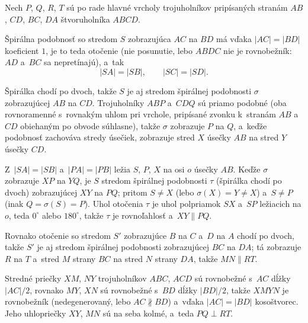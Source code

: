 {
    Nech $P$, $Q$, $R$, $T$ sú po rade hlavné vrcholy trojuholníkov pripísaných stranám $AB$, $CD$, $BC$, $DA$ štvoruholníka $ABCD$.

    Špirálna podobnosť so stredom $S$ zobrazujúca $AC$ na $BD$ má vďaka $|AC| = |BD|$ koeficient $1$, je to teda otočenie (nie posunutie, lebo $ABDC$ nie je rovnobežník: $AD$ a~$BC$ sa nepretínajú), a~tak
    $$
    |SA| = |SB|, \qquad |SC| = |SD|.
    $$

    Špirálka chodí po dvoch, takže $S$ je aj stredom špirálnej podobnosti $\sigma$ zobrazujúcej $AB$ na $CD$. Trojuholníky $ABP$ a~$CDQ$ sú priamo podobné (oba rovnoramenné s~rovnakým uhlom pri vrchole, pripísané zvonku k~stranám $AB$ a~$CD$ obiehaným po obvode súhlasne), takže $\sigma$ zobrazuje $P$ na $Q$, a~keďže podobnosť zachováva stredy úsečiek, zobrazuje stred $X$ úsečky $AB$ na stred $Y$ úsečky $CD$.


    Z~$|SA| = |SB|$ a~$|PA| = |PB|$ ležia $S$, $P$, $X$ na osi $o$ úsečky $AB$. Keďže $\sigma$ zobrazuje $XP$ na $YQ$, je $S$ stredom špirálnej podobnosti $\tau$ (špirálka chodí po dvoch) zobrazujúcej $XY$ na $PQ$; pritom $S \neq X$ (lebo $\sigma(X) = Y \neq X$) a~$S \neq P$ (inak $Q = \sigma(S) = P$). Uhol otočenia $\tau$ je uhol polpriamok $SX$ a~$SP$ ležiacich na $o$, teda $0^\circ$ alebo $180^\circ$, takže $\tau$ je rovnoľahlosť a~$XY \parallel PQ$.

    Rovnako otočenie so stredom $S'$ zobrazujúce $B$ na $C$ a~$D$ na $A$ chodí po dvoch, takže $S'$ je aj stredom špirálnej podobnosti zobrazujúcej $BC$ na $DA$; tá zobrazuje $R$ na $T$ a~stred $M$ strany $BC$ na stred $N$ strany $DA$, takže $MN \parallel RT$.


    Stredné priečky $XM$, $NY$ trojuholníkov $ABC$, $ACD$ sú rovnobežné s~$AC$ dĺžky $|AC|/2$, rovnako $MY$, $XN$ sú rovnobežné s~$BD$ dĺžky $|BD|/2$, takže $XMYN$ je rovnobežník (nedegenerovaný, lebo $AC \nparallel BD$) a~vďaka $|AC| = |BD|$ kosoštvorec. Jeho uhlopriečky $XY$, $MN$ sú na seba kolmé, a~teda $PQ \perp RT$.
}

